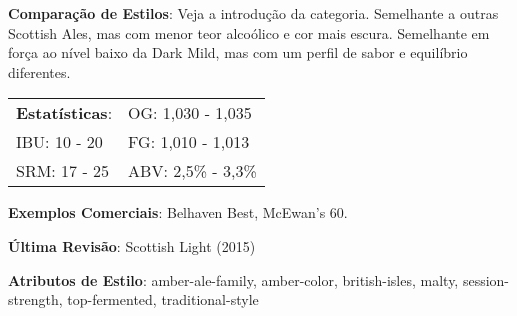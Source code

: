 \textbf{Comparação de Estilos}: Veja a introdução da categoria. Semelhante a outras Scottish Ales, mas com menor teor alcoólico e cor mais escura. Semelhante em força ao nível baixo da Dark Mild, mas com um perfil de sabor e equilíbrio diferentes.

\begin{tabular}{@{}p{35mm}p{35mm}@{}}
  \textbf{Estatísticas}: & OG: 1,030 - 1,035 \\
  IBU: 10 - 20  & FG: 1,010 - 1,013  \\
  SRM: 17 - 25  & ABV: 2,5\% - 3,3\%
\end{tabular}

\textbf{Exemplos Comerciais}: Belhaven Best, McEwan's 60.

\textbf{Última Revisão}: Scottish Light (2015)

\textbf{Atributos de Estilo}: amber-ale-family, amber-color, british-isles, malty, session-strength, top-fermented, traditional-style